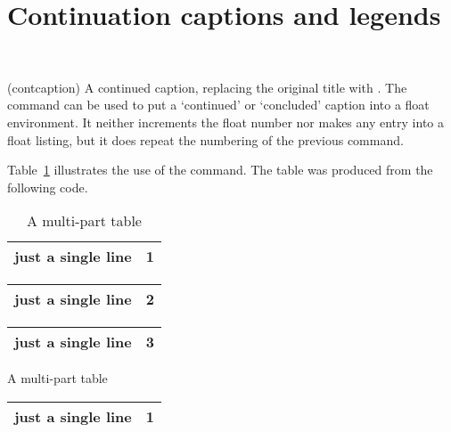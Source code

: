 

 \section{Continuation captions and legends}


\begin{syntax}
\cmd{\contcaption} \\
\end{syntax}
\glossary(contcaption)%
  {}%
  {A continued caption, replacing the original title with .}
    The \cmd{\contcaption} command can be used to put 
 a `continued' or `concluded'
 caption into a float environment. It neither increments the
 float number nor makes any entry into a float listing, but it
 does repeat the numbering of the previous \cmd{\caption} command.
 

   Table~\ref{tab:m} illustrates the use of the \cmd{\contcaption}
 command. The table was produced from the following code.
 \begin{lcode}
   \begin{table}
   \centering
   \caption{A multi-part table} \label{tab:m}
   \begin{tabular}{lc} \toprule
    just a single line & 1 \\ \bottomrule
   \end{tabular}
   \end{table}

   \begin{table}
   \centering
   \begin{tabular}{lc} \toprule
    just a single line & 2 \\ \bottomrule
   \end{tabular}
   \end{table}

   \begin{table}
   \centering
   \begin{tabular}{lc} \toprule
    just a single line & 3 \\ \bottomrule
   \end{tabular}
   \end{table}
 \end{lcode}

   \begin{shadetable}
   \caption{A multi-part table} \label{tab:m}
   \begin{tabular}{lc} \toprule
    just a single line & 1 \\ \bottomrule
   \end{tabular}
   \end{shadetable}

